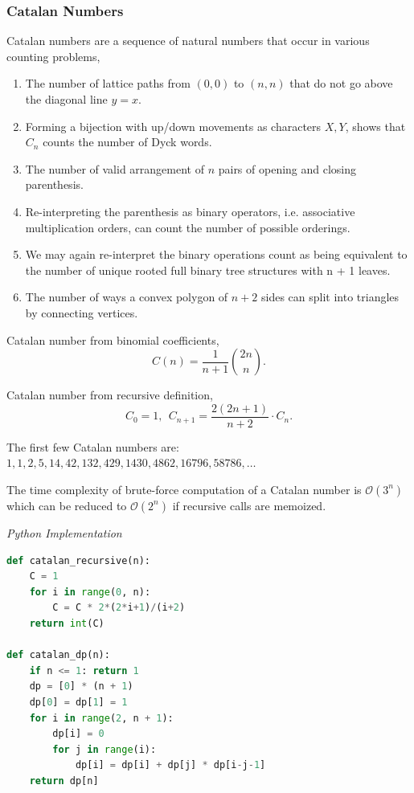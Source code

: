 \documentclass{article}
\newcommand{\bigO}{\mathcal{O}}
\begin{document}
    \subsubsection{Catalan Numbers}
    Catalan numbers are a sequence of natural numbers that occur in various counting problems,
    \begin{enumerate}
        \item The number of lattice paths from $(0, 0)$ to $(n, n)$ that do not go above the diagonal line $y = x$.
        
        \item Forming a bijection with up/down movements as characters $X, Y$, shows that $C_n$ counts the number of Dyck words.
        
        \item The number of valid arrangement of $n$ pairs of opening and closing parenthesis.
        
        \item Re-interpreting the parenthesis as binary operators, i.e. associative multiplication orders, can count the number of possible orderings. 
        
        \item We may again re-interpret the binary operations count as being equivalent to the number of unique rooted full binary tree structures with n + 1 leaves.
        
        \item The number of ways a convex polygon of $n+2$ sides can split into triangles by connecting vertices.
    \end{enumerate}
    Catalan number from binomial coefficients,
    \[
        C(n) = \frac{1}{n+1}\binom{2n}{n}.
    \]
    
    Catalan number from recursive definition,
    \[
    C_0 = 1,\ \ C_{n+1} = \frac{2(2n+1)}{n+2} \cdot C_n. 
    \]
    
    The first few Catalan numbers are: $1, 1, 2, 5, 14, 42, 132, 429, 1430, 4862, 16796, 58786, \dots$ 
    
    The time complexity of brute-force computation of a Catalan number is $\bigO(3^n)$ which can be reduced to $\bigO(2^n)$ if recursive calls are memoized.

\vspace{8pt} \emph{Python Implementation}
\begin{lstlisting}[language=Python]
def catalan_recursive(n):
    C = 1
    for i in range(0, n):
        C = C * 2*(2*i+1)/(i+2)
    return int(C)
    
def catalan_dp(n): 
    if n <= 1: return 1
    dp = [0] * (n + 1) 
    dp[0] = dp[1] = 1
    for i in range(2, n + 1): 
        dp[i] = 0
        for j in range(i): 
            dp[i] = dp[i] + dp[j] * dp[i-j-1] 
    return dp[n]
\end{lstlisting}
\end{document}
